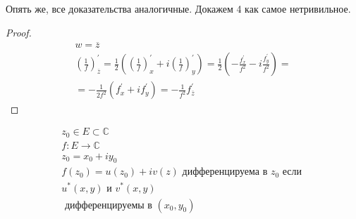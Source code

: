 \documentclass[main]{subfiles}
\begin{document}
Опять же, все доказательства аналогичные. Докажем 4 как самое нетривильное.
\begin{proof}
    \begin{multline*}
        w = \overline{z} \\
        \left(\frac{1}{f}\right)^\prime_{\overline{z}} = \frac{1}{2}\left(\left(\frac{1}{f}\right)^\prime_x + i\left(\frac{1}{f} \right)^\prime_y\right) 
        = \frac{1}{2}\left(-\frac{f^\prime_x}{f^2}-i\frac{f^\prime_y}{f^2}\right) = \\
       = -\frac{1}{2f^2}\left(f^\prime_x + if^\prime_y\right) = -\frac{1}{f^2}f^\prime_{\overline{z}}
    \end{multline*}
\end{proof}

\begin{definition}
    \begin{gather*}
        z_0 \in E \subset \mathbb{C} \\
        f: E \rightarrow \mathbb{C} \\
        z_0 = x_0 + iy_0  \\
        f(z_0) = u(z_0) + iv(z)  \text{ дифференцируема в } z_0 \text{ если }\\
        u^*(x,y) \text{ и } v^*(x,y) \\
        \text{ дифференцируемы в } (x_0, y_0) 
    \end{gather*}
\end{definition}
\end{document}
